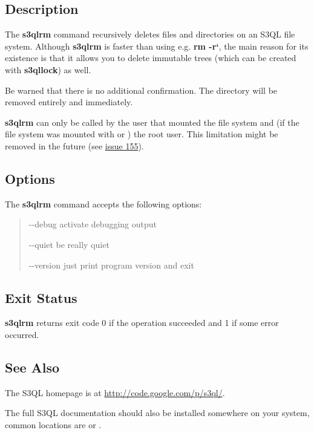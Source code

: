 \documentclass[letterpaper,10pt,english]{sphinxmanual}
\begin{document}
\subsection{Description}
\label{man/rm:description}
The \textbf{s3qlrm} command recursively deletes files and directories on an
S3QL file system. Although \textbf{s3qlrm} is faster than using e.g.
\textbf{rm -r{}`}, the main reason for its existence is that it allows
you to delete immutable trees (which can be created with
\textbf{s3qllock}) as well.

Be warned that there is no additional confirmation. The directory will
be removed entirely and immediately.

\textbf{s3qlrm} can only be called by the user that mounted the file system
and (if the file system was mounted with  or
) the root user. This limitation might be
removed in the future (see \href{http://code.google.com/p/s3ql/issues/detail?id=155}{issue 155}).


\subsection{Options}
\label{man/rm:options}
The \textbf{s3qlrm} command accepts the following options:
\begin{quote}
\begin{optionlist}{3cm}
\item [-{-}debug]  
activate debugging output
\item [-{-}quiet]  
be really quiet
\item [-{-}version]  
just print program version and exit
\end{optionlist}
\end{quote}


\subsection{Exit Status}
\label{man/rm:exit-status}
\textbf{s3qlrm} returns exit code 0 if the operation succeeded and 1 if some
error occurred.


\subsection{See Also}
\label{man/rm:see-also}
The S3QL homepage is at \href{http://code.google.com/p/s3ql/}{http://code.google.com/p/s3ql/}.

The full S3QL documentation should also be installed somewhere on your
system, common locations are  or
.
\end{document}
